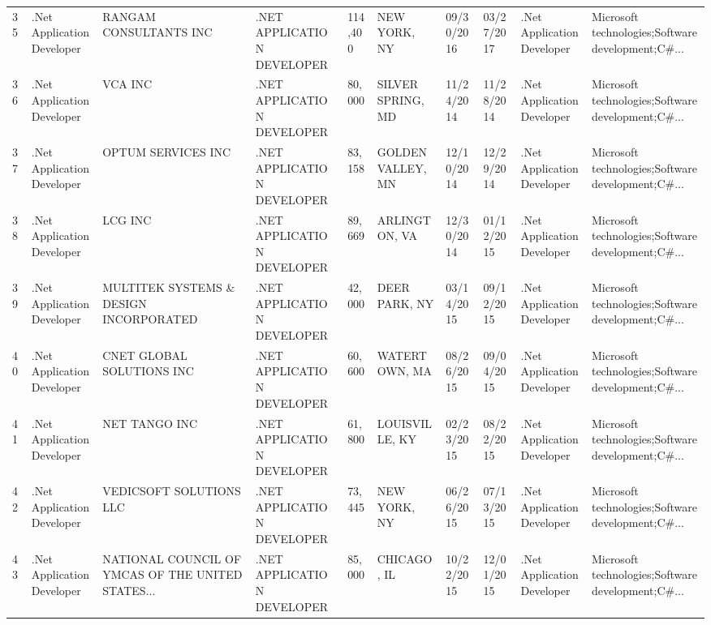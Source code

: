 \begin{table}[h!]
{\begin{tabular}{llllllllll}
	35 &  .Net Application Developer &                             RANGAM CONSULTANTS INC &  .NET APPLICATION DEVELOPER &     114,400 &        NEW YORK, NY &  09/30/2016 &  03/27/2017 &  .Net Application Developer &  Microsoft technologies;Software development;C\#... \\
	36 &  .Net Application Developer &                                            VCA INC &  .NET APPLICATION DEVELOPER &      80,000 &   SILVER SPRING, MD &  11/24/2014 &  11/28/2014 &  .Net Application Developer &  Microsoft technologies;Software development;C\#... \\
	37 &  .Net Application Developer &                                 OPTUM SERVICES INC &  .NET APPLICATION DEVELOPER &      83,158 &   GOLDEN VALLEY, MN &  12/10/2014 &  12/29/2014 &  .Net Application Developer &  Microsoft technologies;Software development;C\#... \\
	38 &  .Net Application Developer &                                            LCG INC &  .NET APPLICATION DEVELOPER &      89,669 &       ARLINGTON, VA &  12/30/2014 &  01/12/2015 &  .Net Application Developer &  Microsoft technologies;Software development;C\#... \\
	39 &  .Net Application Developer &             MULTITEK SYSTEMS \& DESIGN INCORPORATED &  .NET APPLICATION DEVELOPER &      42,000 &       DEER PARK, NY &  03/14/2015 &  09/12/2015 &  .Net Application Developer &  Microsoft technologies;Software development;C\#... \\
	40 &  .Net Application Developer &                          CNET GLOBAL SOLUTIONS INC &  .NET APPLICATION DEVELOPER &      60,600 &       WATERTOWN, MA &  08/26/2015 &  09/04/2015 &  .Net Application Developer &  Microsoft technologies;Software development;C\#... \\
	41 &  .Net Application Developer &                                      NET TANGO INC &  .NET APPLICATION DEVELOPER &      61,800 &      LOUISVILLE, KY &  02/23/2015 &  08/22/2015 &  .Net Application Developer &  Microsoft technologies;Software development;C\#... \\
	42 &  .Net Application Developer &                            VEDICSOFT SOLUTIONS LLC &  .NET APPLICATION DEVELOPER &      73,445 &        NEW YORK, NY &  06/26/2015 &  07/13/2015 &  .Net Application Developer &  Microsoft technologies;Software development;C\#... \\
	43 &  .Net Application Developer &  NATIONAL COUNCIL OF YMCAS OF THE UNITED STATES... &  .NET APPLICATION DEVELOPER &      85,000 &         CHICAGO, IL &  10/22/2015 &  12/01/2015 &  .Net Application Developer &  Microsoft technologies;Software development;C\#... \\

\end{tabular}}
\end{table}
